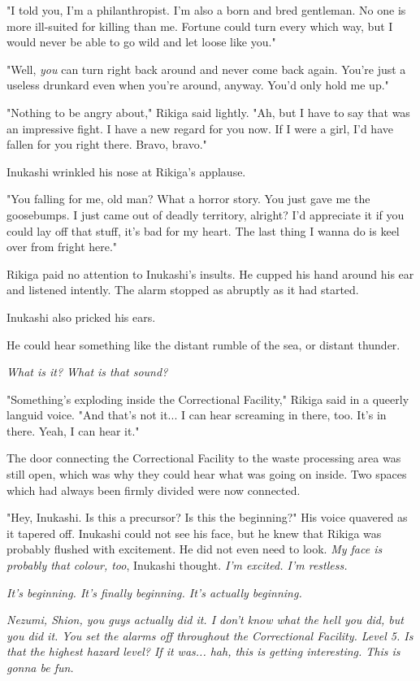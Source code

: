 "I told you, I'm a philanthropist. I'm also a born and bred gentleman.
No one is more ill-suited for killing than me. Fortune could turn every
which way, but I would never be able to go wild and let loose like you."

"Well, \emph{you} can turn right back around and never come back again. You're
just a useless drunkard even when you're around, anyway. You'd only hold
me up."

"Nothing to be angry about," Rikiga said lightly. "Ah, but I have to say
that was an impressive fight. I have a new regard for you now. If I were
a girl, I'd have fallen for you right there. Bravo, bravo."

Inukashi wrinkled his nose at Rikiga's applause.

"You falling for me, old man? What a horror story. You just gave me the
goosebumps. I just came out of deadly territory, alright? I'd appreciate
it if you could lay off that stuff, it's bad for my heart. The last
thing I wanna do is keel over from fright here."

Rikiga paid no attention to Inukashi's insults. He cupped his hand
around his ear and listened intently. The alarm stopped as abruptly as
it had started.

Inukashi also pricked his ears.

He could hear something like the distant rumble of the sea, or distant
thunder.

\emph{What is it? What is that sound?}

"Something's exploding inside the Correctional Facility," Rikiga said in
a queerly languid voice. "And that's not it... I can hear screaming in
there, too. It's in there. Yeah, I can hear it."

The door connecting the Correctional Facility to the waste processing
area was still open, which was why they could hear what was going on
inside. Two spaces which had always been firmly divided were now
connected.

"Hey, Inukashi. Is this a precursor? Is this the beginning?" His voice
quavered as it tapered off. Inukashi could not see his face, but he knew
that Rikiga was probably flushed with excitement. He did not even need
to look. \emph{My face is probably that colour, too}, Inukashi thought. \emph{I'm
excited. I'm restless.}

\emph{It's beginning. It's finally beginning. It's actually beginning.}

\emph{Nezumi, Shion, you guys actually did it. I don't know what the hell you
did, but you did it. You set the alarms off throughout the Correctional
Facility. Level 5. Is that the highest hazard level? If it was... hah,
this is getting interesting. This is gonna be fun.}

